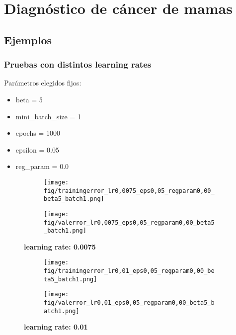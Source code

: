 \section{Diagnóstico de cáncer de mamas}

\subsection{Ejemplos}

\subsubsection{Pruebas con distintos learning rates}

Parámetros elegidos fijos:

\begin{itemize}
\item beta = 5
\item mini\_batch\_size = 1
\item epochs = 1000
\item epsilon = 0.05
\item reg\_param = 0.0
\end{itemize}


\begin{figure}[h]	
	\begin{subfigure}[b]{0.5\textwidth}
		\texttt{[image: fig/trainingerror\_lr0,0075\_eps0,05\_regparam0,00\_beta5\_batch1.png]}
	\end{subfigure}
	\begin{subfigure}[b]{0.5\textwidth}
		\texttt{[image: fig/valerror\_lr0,0075\_eps0,05\_regparam0,00\_beta5\_batch1.png]}
	\end{subfigure}

	\caption{\textbf{learning rate: 0.0075}}
\end{figure}


\begin{figure}[h]	
	\begin{subfigure}[b]{0.5\textwidth}
		\texttt{[image: fig/trainingerror\_lr0,01\_eps0,05\_regparam0,00\_beta5\_batch1.png]}
	\end{subfigure}
	\begin{subfigure}[b]{0.5\textwidth}
		\texttt{[image: fig/valerror\_lr0,01\_eps0,05\_regparam0,00\_beta5\_batch1.png]}
	\end{subfigure}

	\caption{\textbf{learning rate: 0.01}}
\end{figure}

